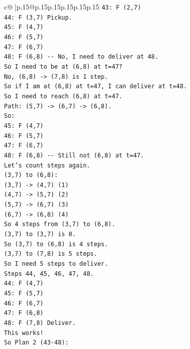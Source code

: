 \documentclass{article}
\begin{document}
{\begin{supertabular}{c@{$\;$}|p{.15\linewidth}@{}p{.15\linewidth}p{.15\linewidth}p{.15\linewidth}p{.15\linewidth}p{.15\linewidth}}
{{{\texttt{43: F (2,7)} \\
\texttt{44: F (3,7) Pickup.} \\
\texttt{45: F (4,7)} \\
\texttt{46: F (5,7)} \\
\texttt{47: F (6,7)} \\
\texttt{48: F (6,8) {-}{-} No, I need to deliver at 48.} \\
\texttt{So I need to be at (6,8) at t=47?} \\
\texttt{No, (6,8) {-}> (7,8) is 1 step.} \\
\texttt{So if I am at (6,8) at t=47, I can deliver at t=48.} \\
\texttt{So I need to reach (6,8) at t=47.} \\
\texttt{Path: (5,7) {-}> (6,7) {-}> (6,8).} \\
\texttt{So:} \\
\texttt{45: F (4,7)} \\
\texttt{46: F (5,7)} \\
\texttt{47: F (6,7)} \\
\texttt{48: F (6,8) {-}{-} Still not (6,8) at t=47.} \\
\texttt{Let's count steps again.} \\
\texttt{(3,7) to (6,8):} \\
\texttt{(3,7) {-}> (4,7) (1)} \\
\texttt{(4,7) {-}> (5,7) (2)} \\
\texttt{(5,7) {-}> (6,7) (3)} \\
\texttt{(6,7) {-}> (6,8) (4)} \\
\texttt{So 4 steps from (3,7) to (6,8).} \\
\texttt{(3,7) to (3,7) is 0.} \\
\texttt{So (3,7) to (6,8) is 4 steps.} \\
\texttt{(3,7) to (7,8) is 5 steps.} \\
\texttt{So I need 5 steps to deliver.} \\
\texttt{Steps 44, 45, 46, 47, 48.} \\
\texttt{44: F (4,7)} \\
\texttt{45: F (5,7)} \\
\texttt{46: F (6,7)} \\
\texttt{47: F (6,8)} \\
\texttt{48: F (7,8) Deliver.} \\
\texttt{This works!} \\
\texttt{So Plan 2 (43{-}48):} \\
}}}
\end{supertabular}}
\end{document}
